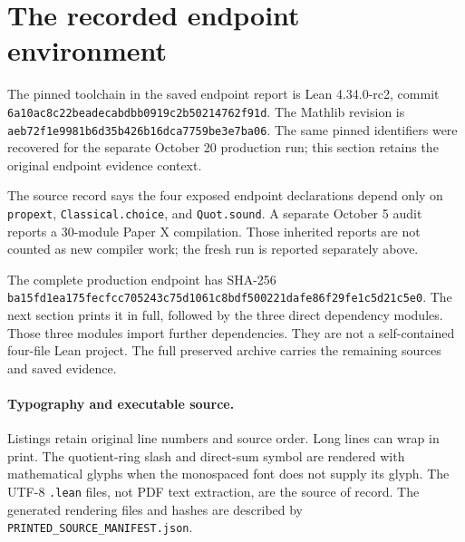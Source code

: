 \documentclass[11pt]{article}
\newcommand{\code}[1]{\nolinkurl{#1}}
\begin{document}
\KomorebiCover
\begin{abstract}
This guide explains the source contracts behind Chapter X rather than treating its
terminal signature as a stand-in for the mathematics. It provides a concordance
of the twenty source records, follows the two independent construction branches,
and distinguishes arithmetic occurrence, finite trace recovery, carrier
presentations, local comparison data, and nonzero occupancy. Four complete
production modules are printed from preserved source. Their saved verification
and the separate October 20 production replay remain explicit.
\end{abstract}
\tableofcontents
\clearpage


\clearpage
\section{The recorded endpoint environment}
The pinned toolchain in the saved endpoint report is Lean 4.34.0-rc2, commit
\code{6a10ac8c22beadecabdbb0919c2b50214762f91d}. The Mathlib revision is
\code{aeb72f1e9981b6d35b426b16dca7759be3e7ba06}. The same pinned identifiers were recovered for the separate October 20
production run; this section retains the original endpoint evidence context.

The source record says the four exposed endpoint declarations depend only on
\code{propext}, \code{Classical.choice}, and \code{Quot.sound}. A separate
October 5 audit reports a 30-module Paper X compilation. Those inherited reports
are not counted as new compiler work; the fresh run is reported separately above.

The complete production endpoint has SHA-256
\code{ba15fd1ea175fecfcc705243c75d1061c8bdf500221dafe86f29fe1c5d21c5e0}.
The next section prints it in full, followed by the three direct dependency
modules. Those three modules import further dependencies. They are not a
self-contained four-file Lean project. The full preserved archive carries the
remaining sources and saved evidence.

\paragraph{Typography and executable source.}
Listings retain original line numbers and source order. Long lines can wrap in
print. The quotient-ring slash and direct-sum symbol are rendered with mathematical glyphs when the
monospaced font does not supply its glyph. The UTF-8 \code{.lean} files, not
PDF text extraction, are the source of record. The generated rendering files
and hashes are described by \code{PRINTED_SOURCE_MANIFEST.json}.
\end{document}
